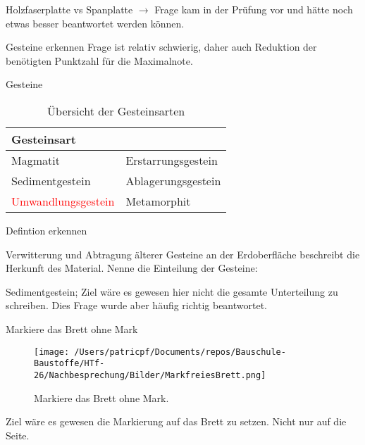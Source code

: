 \begin{frame}{Holzfaserplatte vs Spanplatte}
    $\rightarrow$ Frage kam in der Prüfung vor und hätte noch etwas besser beantwortet werden können.
\end{frame}

\begin{frame}{Gesteine erkennen}
    Frage  ist relativ schwierig, daher auch Reduktion der benötigten Punktzahl für die Maximalnote.

\end{frame}

\begin{frame}{Gesteine}
    \begin{table}[h!]
        \centering
        \begin{tabular}{ll}
            \toprule
            \textbf{Gesteinsart}                & {}                 \\
            \midrule
            Magmatit                            & Erstarrungsgestein \\
            Sedimentgestein                     & Ablagerungsgestein \\
            \textcolor{red}{Umwandlungsgestein} & Metamorphit        \\
            \bottomrule
        \end{tabular}
        \caption{Übersicht der Gesteinsarten}
        \label{tab:gesteinsarten}
    \end{table}

\end{frame}


\begin{frame}{Defintion erkennen}

\begin{Fragenblock}
    Verwitterung und Abtragung älterer Gesteine an der Erdoberfläche beschreibt die Herkunft des Material.
    Nenne die Einteilung der Gesteine:
\end{Fragenblock}
\pause

\begin{myLösung}
Sedimentgestein; Ziel wäre es gewesen hier nicht die gesamte Unterteilung zu schreiben. Dies Frage wurde aber häufig richtig beantwortet.
\end{myLösung}
\end{frame}

\begin{frame}{Markiere das Brett ohne Mark}
\begin{figure}
    \centering
    \texttt{[image: /Users/patricpf/Documents/repos/Bauschule-Baustoffe/HTf-26/Nachbesprechung/Bilder/MarkfreiesBrett.png]}
    \caption{Markiere das Brett ohne Mark.}
    \label{fig:markierebrett}
\end{figure}

\begin{myLösung}
Ziel wäre es gewesen die Markierung auf das Brett zu setzen. Nicht nur auf die Seite.
\end{myLösung}

\end{frame}

